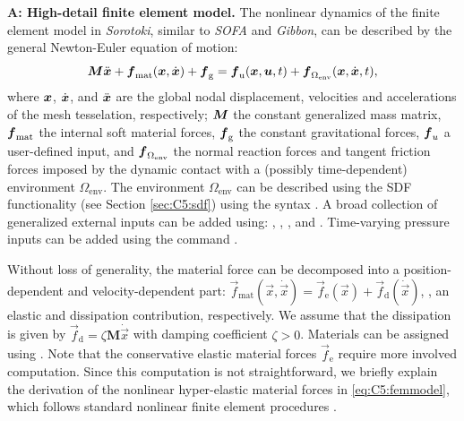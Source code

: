 \textbf{A: High-detail finite element model.} The nonlinear dynamics of the finite element model in \textit{Sorotoki}, similar to \textit{SOFA} and \textit{Gibbon}, can be described by the general Newton-Euler equation of motion:
%
\begin{equation}
    {\boldsymbol{M}} {\ddot{\boldsymbol{x}}} + {\boldsymbol{f}}_\textrm{mat}({\boldsymbol{x}},{\dot{\boldsymbol{x}}}) + {\boldsymbol{f}}_{\scriptstyle\textrm{g}} = {\boldsymbol{f}}_{\textrm{u}}({\boldsymbol{x}},{\boldsymbol{u}},t) + {\boldsymbol{f}}_{\Omega_{\textrm{env}}}({\boldsymbol{x}},{\dot{\boldsymbol{x}}},t),
    \label{eq:C5:femmodel}
\end{equation}
%
where ${\boldsymbol{x}}$, ${\dot{\boldsymbol{x}}}$, and ${\ddot{\boldsymbol{x}}}$ are the global nodal displacement, velocities and accelerations of the mesh tesselation, respectively; ${\boldsymbol{M}}$ the constant generalized mass matrix, ${\boldsymbol{f}}_\textrm{mat}$ the internal soft material forces, ${\boldsymbol{f}}_\textrm{g}$ the constant gravitational forces, ${\boldsymbol{f}}_u$ a user-defined input, and ${\boldsymbol{f}}_{\Omega_{\textrm{env}}}$ the normal reaction forces and tangent friction forces imposed by the dynamic contact with a (possibly time-dependent) environment $\Omega_{\textrm{env}}$. The environment $\Omega_{\textrm{env}}$ can be described using the SDF functionality (see Section \ref{sec:C5:sdf}) using the syntax . A broad collection of generalized external inputs can be added using: , , , and . Time-varying pressure inputs can be added using the command . 

Without loss of generality, the material force can be decomposed into a position-dependent and velocity-dependent part: $\vec{f}_{\textrm{mat}}(\vec{x},\dot{\vec{x}}) = \vec{f}_{\textrm{e}}(\vec{x}) + \vec{f}_{\textrm{d}}(\dot{\vec{x}})$, \ie, an elastic and dissipation contribution, respectively. We assume that the dissipation is given by $\vec{f}_{\textrm{d}} = \zeta \mathbf{M} \dot{\vec{x}}$ with damping coefficient $\zeta > 0$. Materials can be assigned using . Note that the conservative elastic material forces $\vec{f}_{\textrm{e}}$ require more involved computation. Since this computation is not straightforward, we briefly explain the derivation of the nonlinear hyper-elastic material forces in \eqref{eq:C5:femmodel}, which follows standard nonlinear finite element procedures \cite{Kim2018,Holzapfel2002,Smith2018}. \\

